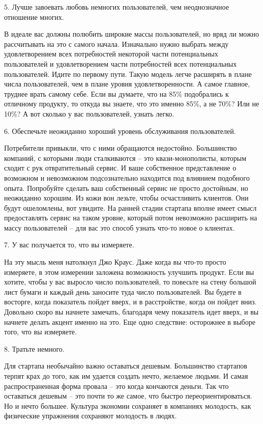 \documentclass[ebook,12pt,oneside,openany]{memoir}
\begin{document}
5. Лучше завоевать любовь немногих пользователей, чем неоднозначное
отношение многих.

В идеале вас должны полюбить широкие массы пользователей, но вряд ли
можно рассчитывать на это с самого начала. Изначально нужно выбрать
между удовлетворением всех потребностей некоторой части потенциальных
пользователей и удовлетворением части потребностей всех потенциальных
пользователей. Идите по первому пути. Такую модель легче расширять в
плане числа пользователей, чем в плане уровня удовлетворенности. А
самое главное, труднее врать самому себе. Если вы думаете, что на 85\%
подобрались к отличному продукту, то откуда вы знаете, что это именно
85\%, а не 70\%? Или не 10\%? А вот сколько у вас пользователей,
узнать легко.

6. Обеспечьте неожиданно хороший уровень обслуживания пользователей.

Потребители привыкли, что с ними обращаются недостойно. Большинство
компаний, с которыми люди сталкиваются – это квази-монополисты,
которым сходит с рук отвратительный сервис. И ваше собственное
представление о возможном и невозможном подсознательно находится под
влиянием подобного опыта. Попробуйте сделать ваш собственный сервис не
просто достойным, но неожиданно хорошим. Из кожи вон лезьте, чтобы
осчастливить клиентов. Они будут ошеломлены, вот увидите. На ранней
стадии стартапа вполне имеет смысл предоставлять сервис на таком
уровне, который потом невозможно расширить на массу пользователей –
для вас это способ узнать что-то новое о клиентах.

7. У вас получается то, что вы измеряете.

На эту мысль меня натолкнул Джо Краус. Даже когда вы что-то просто
измеряете, в этом измерении заложена возможность улучшить продукт.
Если вы хотите, чтобы у вас выросло число пользователей, то повесьте
на стену большой лист бумаги и каждый день заносите туда число
пользователей. Вы будете в восторге, когда показатель пойдет вверх, и
в расстройстве, когда он пойдет вниз. Довольно скоро вы начнете
замечать, благодаря чему показатель идет вверх, и вы начнете делать
акцент именно на это. Еще одно следствие: осторожнее в выборе того,
что вы измеряете.

8. Тратьте немного.

Для стартапа необычайно важно оставаться дешевым. Большинство
стартапов терпят крах до того, как им удается создать нечто, желаемое
людьми. И самая распространенная форма провала – это когда кончаются
деньги. Так что оставаться дешевым – это почти то же самое, что быстро
переориентироваться. Но и нечто большее. Культура экономии сохраняет в
компаниях молодость, как физические упражнения сохраняют молодость в
людях.
\end{document}
